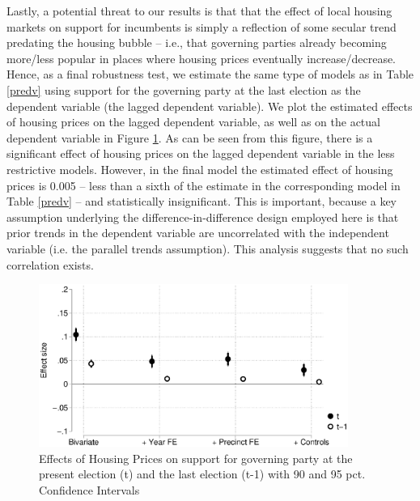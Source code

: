 \documentclass[12pt,a4paper]{article}
\begin{document}
	Lastly, a potential threat to our results is that that the effect of local housing markets on support for incumbents is simply a reflection of some secular trend predating the housing bubble -- i.e., that governing parties already becoming more/less popular in places where housing prices eventually increase/decrease. Hence, as a final robustness test, we estimate the same type of models as in Table \ref{predv} using support for the governing party at the last election as the dependent variable (the lagged dependent variable). We plot the estimated effects of housing prices on the lagged dependent variable, as well as on the actual dependent variable in Figure \ref{placebo}. As can be seen from this figure, there is a significant effect of housing prices on the lagged dependent variable in the less restrictive models. However, in the final model the estimated effect of housing prices is 0.005 -- less than a sixth of the estimate in the corresponding model in Table \ref{predv} -- and statistically insignificant. This is important, because a key assumption underlying the difference-in-difference design employed here is that prior trends in the dependent variable are uncorrelated with the independent variable (i.e. the parallel trends assumption). This analysis suggests that no such correlation exists.
	
	\begin{figure}[htbp!]
		\includegraphics[width=0.9\textwidth]{../figures/lagdv.eps}
		\centering
		\caption{Effects of Housing Prices on support for governing party at the present election (t) and the last election (t-1) with 90  and 95 pct. Confidence Intervals}\label{placebo}
	\end{figure}
	
\end{document}
